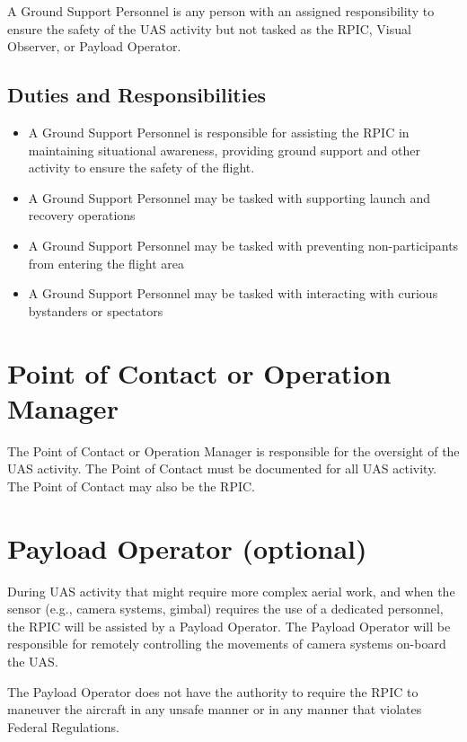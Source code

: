 \documentclass[
]{book}
\providecommand{\tightlist}{%
  \setlength{\itemsep}{0pt}\setlength{\parskip}{0pt}}
\begin{document}
A Ground Support Personnel is any person with an assigned responsibility to ensure the safety of the UAS activity but not tasked as the RPIC, Visual Observer, or Payload Operator.

\subsection{Duties and Responsibilities}\label{duties-and-responsibilities-4}

\begin{itemize}
\tightlist
\item
  A Ground Support Personnel is responsible for assisting the RPIC in maintaining situational awareness, providing ground support and other activity to ensure the safety of the flight.
\item
  A Ground Support Personnel may be tasked with supporting launch and recovery operations
\item
  A Ground Support Personnel may be tasked with preventing non-participants from entering the flight area
\item
  A Ground Support Personnel may be tasked with interacting with curious bystanders or spectators
\end{itemize}

\section{Point of Contact or Operation Manager}\label{point-of-contact-or-operation-manager}

The Point of Contact or Operation Manager is responsible for the oversight of the UAS activity. The Point of Contact must be documented for all UAS activity. The Point of Contact may also be the RPIC.

\section{Payload Operator (optional)}\label{payload-operator-optional}

During UAS activity that might require more complex aerial work, and when the sensor (e.g., camera systems, gimbal) requires the use of a dedicated personnel, the RPIC will be assisted by a Payload Operator. The Payload Operator will be responsible for remotely controlling the movements of camera systems on-board the UAS.

The Payload Operator does not have the authority to require the RPIC to maneuver the aircraft in any unsafe manner or in any manner that violates Federal Regulations.
\end{document}
